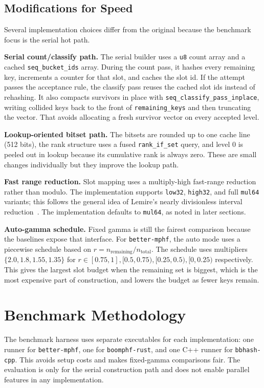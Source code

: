 \documentclass[10pt]{article}
\begin{document}
\subsection{Modifications for Speed}
Several implementation choices differ from the original because the benchmark focus is the serial hot path.

\textbf{Serial count/classify path.} The serial builder uses a \texttt{u8} count array and a cached \texttt{seq\_bucket\_ids} array. During the count pass, it hashes every remaining key, increments a counter for that slot, and caches the slot id. If the attempt passes the acceptance rule, the classify pass reuses the cached slot ids instead of rehashing. It also compacts survivors in place with \texttt{seq\_classify\_pass\_inplace}, writing collided keys back to the front of \texttt{remaining\_keys} and then truncating the vector. That avoids allocating a fresh survivor vector on every accepted level.

\textbf{Lookup-oriented bitset path.} The bitsets are rounded up to one cache line (512 bits), the rank structure uses a fused \texttt{rank\_if\_set} query, and level 0 is peeled out in lookup because its cumulative rank is always zero. These are small changes individually but they improve the lookup path.

\textbf{Fast range reduction.} Slot mapping uses a multiply-high fast-range reduction rather than modulo. The implementation supports \texttt{low32}, \texttt{high32}, and full \texttt{mul64} variants; this follows the general idea of Lemire's nearly divisionless interval reduction~\cite{lemire2019}. The implementation defaults to \texttt{mul64}, as noted in later sections.

\textbf{Auto-gamma schedule.} Fixed gamma is still the fairest comparison because the baselines expose that interface. For \texttt{better-mphf}, the auto mode uses a piecewise schedule based on \(r = n_{\mathrm{remaining}} / n_{\mathrm{total}}\). The schedule uses multipliers $\{2.0, 1.8, 1.55, 1.35\}$ for $r \in [0.75,1], [0.5,0.75), [0.25,0.5), [0,0.25)$ respectively. This gives the largest slot budget when the remaining set is biggest, which is the most expensive part of construction, and lowers the budget as fewer keys remain.

\section{Benchmark Methodology}
The benchmark harness uses separate executables for each implementation: one runner for \texttt{better-mphf}, one for \texttt{boomphf-rust}, and one C++ runner for \texttt{bbhash-cpp}. This avoids setup costs and makes fixed-gamma comparisons fair. The evaluation is only for the serial construction path and does not enable parallel features in any implementation.
\end{document}
